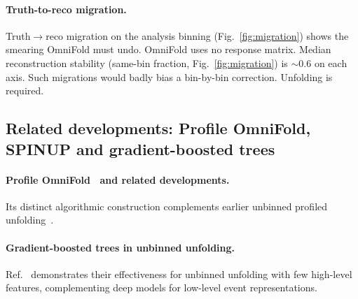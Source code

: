 \paragraph{Truth-to-reco migration.} Truth$\to$reco migration on the analysis binning (Fig.~\ref{fig:migration}) shows the smearing OmniFold must undo. OmniFold uses no response matrix. Median reconstruction stability (same-bin fraction, Fig.~\ref{fig:migration}) is $\sim0.6$ on each axis. Such migrations would badly bias a bin-by-bin correction. Unfolding is required.

\subsection{Related developments: Profile OmniFold, SPINUP and gradient-boosted trees}\label{recsec:method-related}

\paragraph{Profile OmniFold~\cite{Zhu:2025profile} and related developments.} Its distinct algorithmic construction complements earlier unbinned profiled unfolding~\cite{Chan:2023tbf}.

\paragraph{Gradient-boosted trees in unbinned unfolding.} Ref.~\cite{Milton:2025tools} demonstrates their effectiveness for unbinned unfolding with few high-level features, complementing deep models for low-level event representations.

